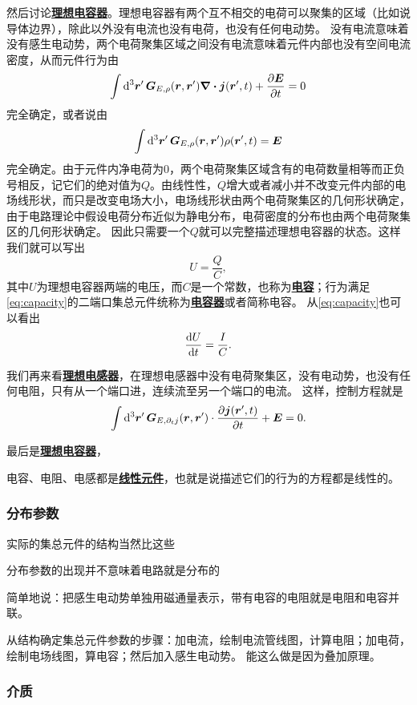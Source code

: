 \documentclass[UTF8, a4paper]{ctexart}
\newcommand*{\concept}[1]{\underline{\textbf{#1}}}
\begin{document}
然后讨论\concept{理想电容器}。理想电容器有两个互不相交的电荷可以聚集的区域（比如说导体边界），除此以外没有电流也没有电荷，也没有任何电动势。
没有电流意味着没有感生电动势，两个电荷聚集区域之间没有电流意味着元件内部也没有空间电流密度，从而元件行为由
\[
    \int \dd[3]{\vb*{r}'} \vb*{G}_{E, \rho}(\vb*{r}, \vb*{r}') \div{\vb*{j}}(\vb*{r}', t) + \pdv{\vb*{E}}{t} = 0
\]
完全确定，或者说由
\[
    \int \dd[3]{\vb*{r}'} \vb*{G}_{E, \rho}(\vb*{r}, \vb*{r}') \rho(\vb*{r}', t) = \vb*{E}
\]
完全确定。由于元件内净电荷为0，两个电荷聚集区域含有的电荷数量相等而正负号相反，记它们的绝对值为$Q$。由线性性，$Q$增大或者减小并不改变元件内部的电场线形状，而只是改变电场大小，电场线形状由两个电荷聚集区的几何形状确定，由于电路理论中假设电荷分布近似为静电分布，电荷密度的分布也由两个电荷聚集区的几何形状确定。
因此只需要一个$Q$就可以完整描述理想电容器的状态。这样我们就可以写出
\begin{equation}
    U = \frac{Q}{C},
    \label{eq:capacity}
\end{equation}
其中$U$为理想电容器两端的电压，而$C$是一个常数，也称为\concept{电容}；行为满足\eqref{eq:capacity}的二端口集总元件统称为\concept{电容器}或者简称电容。
从\eqref{eq:capacity}也可以看出
\[
    \dv{U}{t} = \frac{I}{C}.
\]

我们再来看\concept{理想电感器}，在理想电感器中没有电荷聚集区，没有电动势，也没有任何电阻，只有从一个端口进，连续流至另一个端口的电流。
这样，控制方程就是
\[
    \int \dd[3]{\vb*{r}'} \vb*{G}_{E, \partial_t j}(\vb*{r}, \vb*{r}') \cdot \pdv{\vb*{j}(\vb*{r}', t)}{t} + \vb*{E} = 0.
\]

最后是\concept{理想电容器}，

电容、电阻、电感都是\concept{线性元件}，也就是说描述它们的行为的方程都是线性的。

\subsubsection{分布参数}

实际的集总元件的结构当然比这些

分布参数的出现并不意味着电路就是分布的

简单地说：把感生电动势单独用磁通量表示，带有电容的电阻就是电阻和电容并联。

从结构确定集总元件参数的步骤：加电流，绘制电流管线图，计算电阻；加电荷，绘制电场线图，算电容；然后加入感生电动势。
能这么做是因为叠加原理。

\subsubsection{介质}
\end{document}
